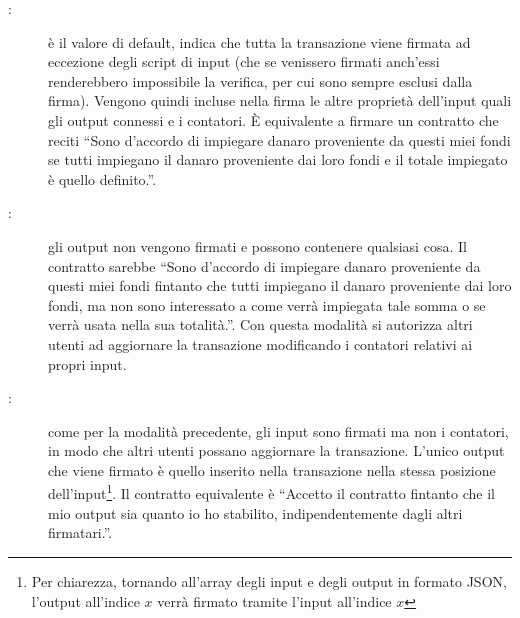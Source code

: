 \begin{description}
    \item[:] è il valore di default, indica che tutta la transazione viene firmata ad eccezione degli script di input (che se venissero firmati anch'essi renderebbero impossibile la verifica, per cui sono sempre esclusi dalla firma). Vengono quindi incluse nella firma le altre proprietà dell'input quali gli output connessi e i contatori. È equivalente a firmare un contratto che reciti ``Sono d'accordo di impiegare danaro proveniente da questi miei fondi se tutti impiegano il danaro proveniente dai loro fondi e il totale impiegato è quello definito.''.
    \item[:] gli output non vengono firmati e possono contenere qualsiasi cosa. Il contratto sarebbe ``Sono d'accordo di impiegare danaro proveniente da questi miei fondi fintanto che tutti impiegano il danaro proveniente dai loro fondi, ma non sono interessato a come verrà impiegata tale somma o se verrà usata nella sua totalità.''. Con questa modalità si autorizza altri utenti ad aggiornare la transazione modificando i contatori relativi ai propri input.
    \item[:] come per la modalità precedente, gli input sono firmati ma non i contatori, in modo che altri utenti possano aggiornare la transazione. L'unico output che viene firmato è quello inserito nella transazione nella stessa posizione dell'input\footnote{Per chiarezza, tornando all'array degli input e degli output in formato JSON, l'output all'indice $x$ verrà firmato tramite l'input  all'indice $x$}. Il contratto equivalente è ``Accetto il contratto fintanto che il mio output sia quanto io ho stabilito, indipendentemente dagli altri firmatari.''.
\end{description}

